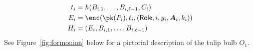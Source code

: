 \documentclass[runningheads,a4paper]{llncs}
\begin{document}
\begin{align*}
t_i &= h(B_{i,1}, \dots, B_{i, \ell-1}, C_i) \\
E_i &= \enc(\pk(P_i), t_i, (\text{{$\mathsf{Role}$}}, \text{$i$}, \text{$y_i$}, 
\text{$\vec{A}_i$}, 
\text{$k_i$})) \\
H_i &= (E_i, B_{i, 1}, \dots, B_{i, \ell-1}) 
\end{align*}
See Figure~\ref{fig:formonion} below for a pictorial description of the tulip bulb $O_1$. 
\end{document}
